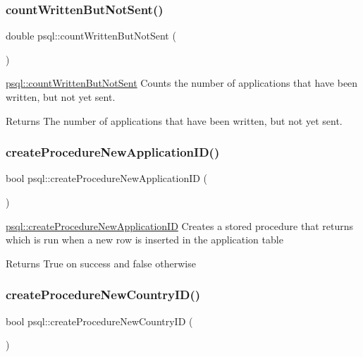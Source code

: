 \subsubsection{\texorpdfstring{count\+Written\+But\+Not\+Sent()}{countWrittenButNotSent()}}
{\footnotesize\ttfamily double psql\+::count\+Written\+But\+Not\+Sent (\begin{DoxyParamCaption}{ }\end{DoxyParamCaption})}



\mbox{\hyperlink{classpsql_a70ad9f4b00735a55232f46da4edd2edc}{psql\+::count\+Written\+But\+Not\+Sent}} Counts the number of applications that have been written, but not yet sent. 

\begin{DoxyReturn}{Returns}
The number of applications that have been written, but not yet sent. 
\end{DoxyReturn}
\mbox{\label{classpsql_ae9e3ee06f4a5ecd4178662dfa0655fe1}} 
\subsubsection{\texorpdfstring{create\+Procedure\+New\+Application\+I\+D()}{createProcedureNewApplicationID()}}
{\footnotesize\ttfamily bool psql\+::create\+Procedure\+New\+Application\+ID (\begin{DoxyParamCaption}{ }\end{DoxyParamCaption})}



\mbox{\hyperlink{classpsql_ae9e3ee06f4a5ecd4178662dfa0655fe1}{psql\+::create\+Procedure\+New\+Application\+ID}} Creates a stored procedure that returns which is run when a new row is inserted in the application table 

\begin{DoxyReturn}{Returns}
True on success and false otherwise 
\end{DoxyReturn}
\mbox{\label{classpsql_a565bfc828ecb6b5621354128773494fd}} 
\subsubsection{\texorpdfstring{create\+Procedure\+New\+Country\+I\+D()}{createProcedureNewCountryID()}}
{\footnotesize\ttfamily bool psql\+::create\+Procedure\+New\+Country\+ID (\begin{DoxyParamCaption}{ }\end{DoxyParamCaption})}




